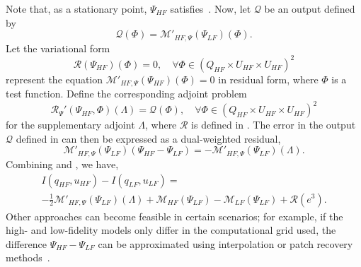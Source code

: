 Note that, as a stationary point, $\Psi_{HF}$ satisfies~. Now, let $\mathcal{Q}$ be an output defined by
%
\begin{equation}
\mathcal{Q}(\Phi)=\mathcal{M}'_{HF,\Psi}(\Psi_{LF})(\Phi).
\label{eq:supadjout}
\end{equation}
%
Let the variational form
%
\begin{equation}
\mathscr{R}(\Psi_{HF})(\Phi)=0,\quad\forall\Phi\in(Q_{HF}\times U_{HF}\times U_{HF})^2
\label{eq:supadjsys}
\end{equation}
%
represent the equation $\mathcal{M}'_{HF,\Psi}(\Psi_{HF})(\Phi)=0$ in residual form, where $\Phi$ is a test function. Define the corresponding adjoint problem
%
\begin{equation}
\mathscr{R}_{\Psi}'(\Psi_{HF},\Phi)(\Lambda)=\mathcal{Q}(\Phi),\quad\forall\Phi\in(Q_{HF}\times U_{HF}\times U_{HF})^2
\label{eq:superAdjEq}
\end{equation}
for the supplementary adjoint $\Lambda$, where $\mathscr{R}$ is defined in . The error in the output $\mathcal{Q}$ defined in  can then be expressed as a dual-weighted residual,
\begin{equation}
\label{eq:adjOutErr}
\mathcal M'_{HF,\Psi}(\Psi_{LF})(\Psi_{HF}-\Psi_{LF})=-\mathcal{M}'_{HF,\Psi}(\Psi_{LF})(\Lambda).
\end{equation}
%
Combining  and , we have,
\begin{multline}
\label{eq:finErrExp}
I(q_{HF},u_{HF})-I(q_{LF},u_{LF})=\\-\frac{1}{2}\mathcal{M}'_{HF,\Psi}(\Psi_{LF})(\Lambda)+\mathcal M_{HF}(\Psi_{LF})-\mathcal M_{LF}(\Psi_{LF})+\mathcal{R}(e^3).
\end{multline}
%
Other approaches can become feasible in certain scenarios; for example, if the high- and low-fidelity models only differ in the computational grid used, the difference $\Psi_{HF}-\Psi_{LF}$ can be approximated using interpolation or patch recovery methods~\cite{BecVex05}.

